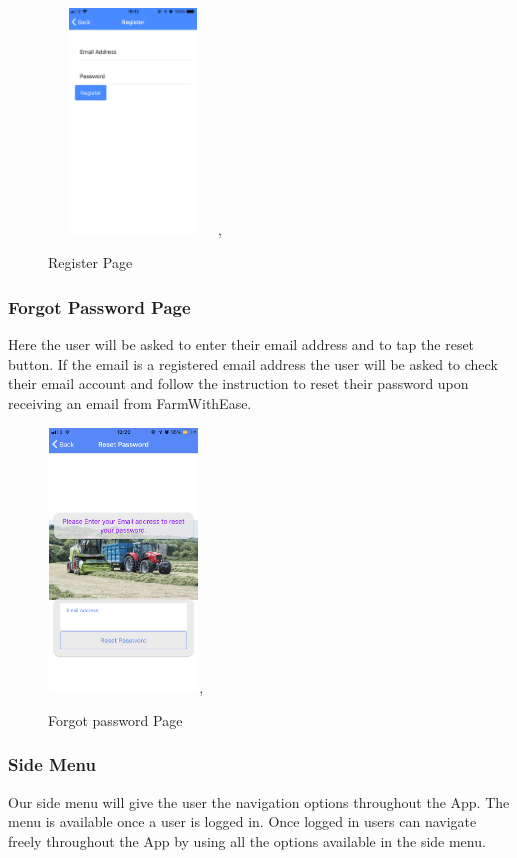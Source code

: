 \documentclass[12pt,a4paper,oneside,openany]{book}
\begin{document}
\begin{figure}[ht]
\renewcommand\thefigure{5.10}
\centering
\includegraphics[width=4.5cm,height=6cm]{Images/registerpage.jpg},
\caption{Register Page}
\label{register}
\end{figure}

\newpage

\subsubsection{Forgot Password Page}
Here the user will be asked to enter their email address and to tap the reset button. If the email is a registered email address the user will be asked to check their email account and follow the instruction to reset their password upon receiving an email from FarmWithEase.

\begin{figure}[ht]
\renewcommand\thefigure{5.11}
\centering
\includegraphics[width=4cm,height=7cm]{Images/password.png},
\caption{Forgot password Page}
\label{password}
\end{figure}

\subsubsection{Side Menu}
Our side menu will give the user the navigation options throughout the App. The menu is available once a user is logged in. Once logged in users can navigate freely throughout the App by using all the options available in the side menu.
\end{document}
